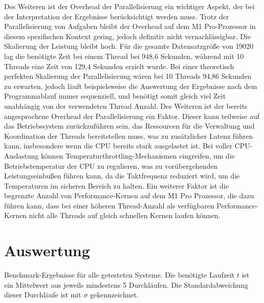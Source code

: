 Des Weiteren ist der Overhead der Parallelisierung ein wichtiger Aspekt, der bei der Interpretation der Ergebnisse berücksichtigt werden muss. Trotz der Parallelisierung von Aufgaben bleibt der Overhead auf dem M1 Pro-Prozessor in diesem spezifischen Kontext gering, jedoch definitiv nicht vernachlässigbar. Die Skalierung der Leistung bleibt hoch. Für die gesamte Datensatzgröße von 19020 lag die benötigte Zeit bei einem Thread bei 948,6 Sekunden, während mit 10 Threads eine Zeit von 129,4 Sekunden erzielt wurde. Bei einer theoretisch perfekten Skalierung der Parallelisierung wären bei 10 Threads 94,86 Sekunden zu erwarten, jedoch läuft beispielsweise die Auswertung der Ergebnisse nach dem Programmablauf immer sequenziell, und benötigt somit gleich viel Zeit unabhängig von der verwendeten Thread Anzahl. Des Weiteren ist der bereits angesprochene Overhead der Parallelisierung ein Faktor. Dieser kann teilweise auf das Betriebssystem zurückzuführen sein, das Ressourcen für die Verwaltung und Koordination der Threads bereitstellen muss, was zu zusätzlicher Latenz führen kann, insbesondere wenn die CPU bereits stark ausgelastet ist. Bei voller CPU-Auslastung können Temperaturthrottling-Mechanismen eingreifen, um die Betriebstemperatur der CPU zu regulieren, was zu vorübergehenden Leistungseinbußen führen kann, da die Taktfrequenz reduziert wird, um die Temperaturen im sicheren Bereich zu halten. Ein weiterer Faktor ist die begrenzte Anzahl von Performance-Kernen auf dem M1 Pro Prozessor, die dazu führen kann, dass bei einer höheren Thread-Anzahl als verfügbaren Performance-Kernen nicht alle Threads auf gleich schnellen Kernen laufen können.


\section{Auswertung}

\begin{table}[H]
\caption{Benchmark-Ergebnisse für alle getesteten Systeme. Die benötigte Laufzeit $t$ ist ein Mittelwert aus jeweils mindestens 5 Durchläufen. Die Standardabweichung dieser Durchläufe ist mit $\sigma$ gekennzeichnet.}
\label{tab:performance_comparison}
\begin{adjustbox}{max width=\textwidth}
\renewcommand{\arraystretch}{1.5}

\end{adjustbox}
\end{table}
